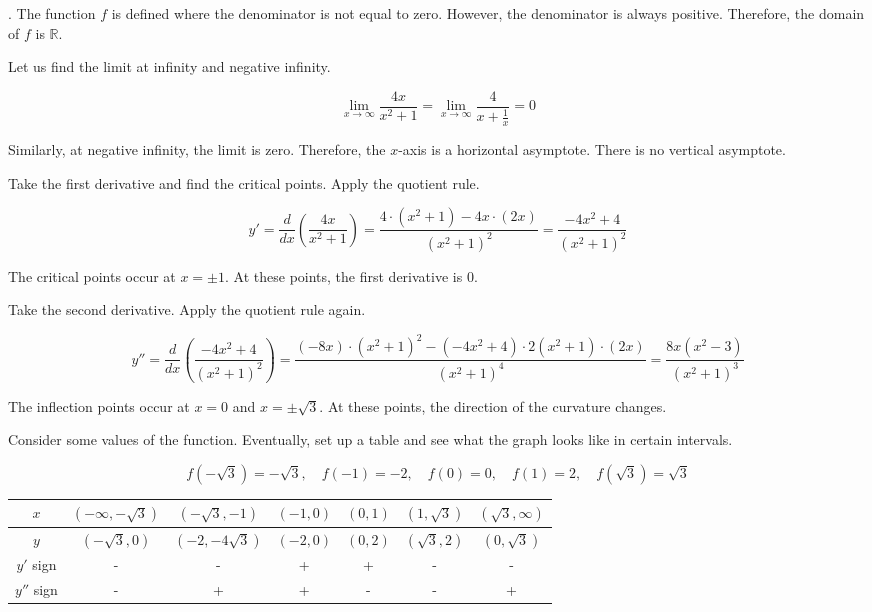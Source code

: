 \documentclass{article}
\begin{document}
\hfill

. The function $f$ is defined where the denominator is not equal to zero. However, the denominator is always positive. Therefore, the domain of $f$ is $\mathbb{R}$.

\hfill

\noindent Let us find the limit at infinity and negative infinity.

\[\lim_{x\to\infty}\frac{4x}{x^2+1}=\lim_{x\to\infty}\frac{4}{x+\frac1x}=0\]

\hfill

\noindent Similarly, at negative infinity, the limit is zero. Therefore, the $x$-axis is a horizontal asymptote. There is no vertical asymptote.

\hfill

\noindent Take the first derivative and find the critical points. Apply the quotient rule.

\[y'=\frac d{dx}\left(\frac{4x}{x^2+1}\right)=\frac{4\cdot\left(x^2+1\right)-4x\cdot(2x)}{\left(x^2+1\right)^2}=\frac{-4x^2+4}{\left(x^2+1\right)^2}\]

\hfill

\noindent The critical points occur at $x=\pm1$. At these points, the first derivative is $0$.

\hfill

\noindent Take the second derivative. Apply the quotient rule again.

\[y''=\frac d{dx}\left(\frac{-4x^2+4}{\left(x^2+1\right)^2}\right)=\frac{\left(-8x\right)\cdot\left(x^2+1\right)^2-\left(-4x^2+4\right)\cdot2\left(x^2+1\right)\cdot(2x)}{\left(x^2+1\right)^4}=\frac{8x\left(x^2-3\right)}{\left(x^2+1\right)^3}\]

\hfill

\noindent The inflection points occur at $x=0$ and $x=\pm\sqrt3$. At these points, the direction of the curvature changes.

\hfill

\noindent Consider some values of the function. Eventually, set up a table and see what the graph looks like in certain intervals.

\[f\left(-\sqrt3\right)=-\sqrt3,\quad f(-1)=-2,\quad f(0)=0,\quad f(1)=2,\quad f\left(\sqrt3\right)=\sqrt3\]

\begin{center}
    \large
    \begin{tabular}{|c|cccccc|} 
    \hline
        $x$&$\left(-\infty,-\sqrt3\right)$&$\left(-\sqrt3,-1\right)$&$\left(-1,0\right)$&$\left(0,1\right)$&$\left(1,\sqrt3\right)$&$\left(\sqrt3,\infty\right)$\\
        \hline
        $y$&$\left(-\sqrt3,0\right)$&$\left(-2, -4\sqrt3\right)$&$(-2,0)$&$(0,2)$&$\left(\sqrt3,2\right)$&$\left(0,\sqrt3\right)$\\
        \hline
        $y'$ sign&-&-&+&+&-&-\\
        \hline
        $y''$ sign&-&+&+&-&-&+\\
        \hline
    \end{tabular}
\end{center}
\end{document}
